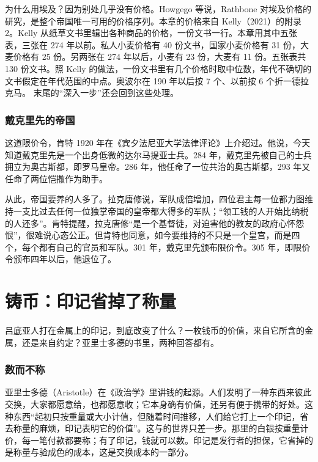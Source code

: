 为什么用埃及？因为别处几乎没有价格。Howgego 等说，Rathbone 对埃及价格的研究，是整个帝国唯一可用的价格序列\cite{howgego2010}。本章的价格来自 Kelly（2021）的附录 2。Kelly 从纸草文书里辑出各种商品的价格，一份文书一行\cite{kelly2021}。本章用其中五张表，三张在 274 年以前。私人小麦价格有 40 份文书，国家小麦价格有 31 份，大麦价格有 25 份。另两张在 274 年以后，小麦有 23 份，大麦有 11 份。五张表共 130 份文书。照 Kelly 的做法，一份文书里有几个价格时取中位数，年代不确切的文书假定在年代范围的中点。奥波尔在 190 年以后按 7 个、以前按 6 个折一德拉克马\cite{kelly2021}。 末尾的“深入一步”还会回到这些处理。

\subsubsection{戴克里先的帝国}
这道限价令，肯特 1920 年在《宾夕法尼亚大学法律评论》上介绍过。他说，今天知道戴克里先是一个出身低微的达尔马提亚士兵。284 年，戴克里先被自己的士兵拥立为奥古斯都，即罗马皇帝。286 年，他任命了一位共治的奥古斯都，293 年又任命了两位恺撒作为助手\cite{kent1920}。

从此，帝国要养的人多了。拉克唐修说，军队成倍增加，四位君主每一位都力图维持一支比过去任何一位独掌帝国的皇帝都大得多的军队；“领工钱的人开始比纳税的人还多”\cite{lactantius}。肯特提醒，拉克唐修“是一个基督徒，对迫害他的教友的政府心怀怨恨”，很难说心态公正。但肯特也同意，如今要维持的不只是一个皇宫，而是四个，每个都有自己的官员和军队\cite{kent1920}。301 年，戴克里先颁布限价令。305 年，即限价令颁布四年以后，他退位了\cite{kent1920}。

\section{铸币：印记省掉了称量}\label{sec:greek-coin}

吕底亚人打在金属上的印记，到底改变了什么？一枚钱币的价值，来自它所含的金属，还是来自约定？亚里士多德的书里，两种回答都有。

\subsubsection{数而不称}
亚里士多德（Aristotle）在《政治学》里讲钱的起源。人们发明了一种东西来彼此交换，大家都愿意给，也都愿意收；它本身确有价值，还另有便于携带的好处。这种东西“起初只按重量或大小计值，但随着时间推移，人们给它打上一个印记，省去称量的麻烦，印记表明它的价值”\cite{politics}。这与的世界只差一步。那里的白银按重量计价，每一笔付款都要称；有了印记，钱就可以数。印记是发行者的担保，它省掉的是称量与验成色的成本，这是交换成本的一部分。

